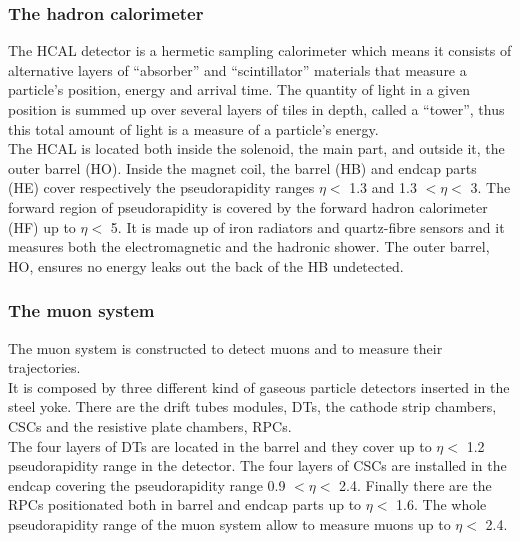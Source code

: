 \subsubsection{The hadron calorimeter}
The HCAL detector is a hermetic sampling calorimeter which means it
consists of alternative layers of ``absorber'' and ``scintillator''
materials that measure a particle’s position, energy and arrival time.
The quantity of light in a given position is summed up over several
layers of tiles in depth, called a “tower”, thus this total amount of
light is a measure of a particle’s energy.\\
The HCAL is located both inside the solenoid, the main part, and
outside it, the outer barrel (HO). 
Inside the magnet coil, the barrel (HB) and endcap parts (HE) cover
respectively the pseudorapidity
ranges $\eta<$ 1.3 and 1.3 $<\eta<$ 3.
The forward region of pseudorapidity is covered by the forward hadron
calorimeter (HF) up to $\eta<$ 5. It is made up of iron radiators and
quartz-fibre sensors and it measures both the electromagnetic and the hadronic shower. 
The outer barrel, HO, ensures no energy leaks out the
back of the HB undetected.

\subsubsection{The muon system}\label{sec:muonsystem}
The muon system is constructed to detect muons and to measure their trajectories.\\ 
It is composed by three different kind of gaseous particle
detectors inserted in the steel yoke. There are the drift tubes
modules, DTs, the cathode strip chambers, CSCs and the resistive plate
chambers, RPCs.\\
The four layers of DTs are located in the barrel and they cover up to
$\eta<$ 1.2 pseudorapidity range in the detector. The four layers of
CSCs are installed in the endcap covering the pseudorapidity range 0.9
$<\eta<$ 2.4. Finally there are the RPCs positionated both in barrel
and endcap parts up to $\eta<$ 1.6. The whole pseudorapidity range of
the muon system allow to measure muons up to $\eta<$ 2.4.

